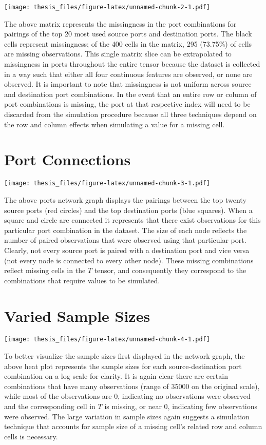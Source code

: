 \documentclass[12pt,twoside]{dukestatscithesis}
\theoremstyle{definition}
\theoremstyle{definition}
\theoremstyle{definition}
\theoremstyle{remark}
\begin{document}
\texttt{[image: thesis\_files/figure-latex/unnamed-chunk-2-1.pdf]}

The above matrix represents the missingness in the port combinations for
pairings of the top 20 most used source ports and destination ports. The
black cells represent missingness; of the 400 cells in the matrix, 295
(73.75\%) of cells are missing observations. This single matrix slice
can be extrapolated to missingness in ports throughout the entire tensor
because the dataset is collected in a way such that either all four
continuous features are observed, or none are observed. It is important
to note that missingness is not uniform across source and destination
port combinations. In the event that an entire row or column of port
combinations is missing, the port at that respective index will need to
be discarded from the simulation procedure because all three techniques
depend on the row and column effects when simulating a value for a
missing cell.

\section{Port Connections}\label{port-connections}

\texttt{[image: thesis\_files/figure-latex/unnamed-chunk-3-1.pdf]}

The above ports network graph displays the pairings between the top
twenty source ports (red circles) and the top destination ports (blue
squares). When a square and circle are connected it represents that
there exist observations for this particular port combination in the
dataset. The size of each node reflects the number of paired
observations that were observed using that particular port. Clearly, not
every source port is paired with a destination port and vice versa (not
every node is connected to every other node). These missing combinations
reflect missing cells in the \(T\) tensor, and consequently they
correspond to the combinations that require values to be simulated.

\section{Varied Sample Sizes}\label{varied-sample-sizes}

\texttt{[image: thesis\_files/figure-latex/unnamed-chunk-4-1.pdf]}

To better visualize the sample sizes first displayed in the network
graph, the above heat plot represents the sample sizes for each
source-destination port combination on a log scale for clarity. It is
again clear there are certain combinations that have many observations
(range of 35000 on the original scale), while most of the observations
are 0, indicating no observations were observed and the corresponding
cell in \(T\) is missing, or near 0, indicating few observations were
observed. The large variation in sample sizes again suggests a
simulation technique that accounts for sample size of a missing cell's
related row and column cells is necessary.
\end{document}
